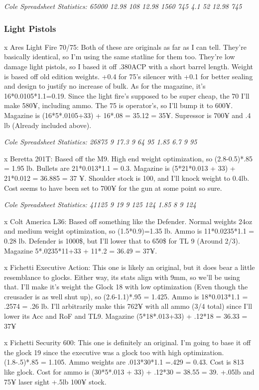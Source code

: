 \begin{multicols*}{2}
	\textit{\textcolor{OliveGreen}{Cole Spreadsheet Statistics: 65000 12.98 108 12.98 1560 745 4.1 52 12.98 745}}
	
	\subsubsection{Light Pistols}
	
	x Ares Light Fire 70/75: Both of these are originals as far as I can tell. They're basically identical, so I'm using the same statline for them too. They're low damage light pistols, so I based it off .380ACP with a short barrel length. Weight is based off old edition weights.  +0.4 for 75's silencer with +0.1 for better sealing and design to justify no increase of bulk. As for the magazine, it's 16*0.0105*1.1=0.19. Since the light fire's supposed to be super cheap, the 70 I'll make 580¥, including ammo. The 75 is operator's, so I'll bump it to 600¥. Magazine is (16*5*.0105+33) + 16*.08 = 35.12 = 35¥. Supressor is 700¥ and .4 lb (Already included above).
	
	\textit{\textcolor{OliveGreen}{Cole Spreadsheet Statistics: 26875 9 17.3 9 64 95 1.85 6.7 9 95}}
	
	x Beretta 201T: Based off the M9. High end weight optimization, so (2.8-0.5)*.85 = 1.95 lb. Bullets are 21*0.013*1.1 = 0.3. Magazine is (5*21*0.013 + 33) + 21*0.012 = 36.885 = 37 ¥. Shoulder stock is 100, and I'll knock weight to 0.4lb. Cost seems to have been set to 700¥ for the gun at some point so sure.
	
	\textit{\textcolor{OliveGreen}{Cole Spreadsheet Statistics: 41125 9 19 9 125 124 1.85 8 9 124}}
	
	x Colt America L36: Based off something like the Defender. Normal weights 24oz and medium weight optimization, so (1.5*0.9)=1.35 lb. Ammo is 11*0.0235*1.1 = 0.28 lb. Defender is 1000\$, but I'll lower that to 650\$ for TL 9 (Around 2/3). Magazine 5*.0235*11+33 + 11*.2 = 36.49 = 37¥.
	
	x Fichetti Executive Action: This one is likely an original, but it does bear a little resemblance to glocks. Either way, its stats align with 9mm, so we'll be using that. I'll make it's weight the Glock 18 with low optimization (Even though the creusader is as well shut up), so (2.6-1.1)*.95 = 1.425. Ammo is 18*0.013*1.1 = .2574 = .26 lb. I'll arbitrarily make this 762¥ with all ammo (3/4 total) since I'll lower its Acc and RoF and TL9. Magazine (5*18*.013+33) + .12*18 = 36.33 = 37¥
	
	x Fichetti Security 600: This one is definitely an original. I'm going to base it off the glock 19 since the executive was a glock too with high optimization. (1.8-.5)*.85 = 1.105. Ammo weights are .013*30*1.1 =.429 = 0.43. Cost is 813 like glock. Cost for ammo is (30*5*.013 + 33) + .12*30 = 38.55 = 39. +.05lb and 75¥ laser sight +.5lb 100¥ stock. 
	

\end{multicols*}
